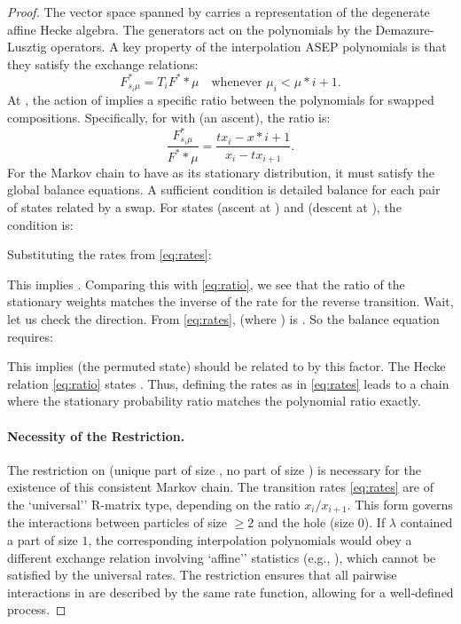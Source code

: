 \documentclass[12pt]{article}
\begin{document}
\begin{proof}
The vector space spanned by  carries a representation of the degenerate affine Hecke algebra. The generators  act on the polynomials  by the Demazure-Lusztig operators. A key property of the interpolation ASEP polynomials is that they satisfy the exchange relations:
\begin{equation} \label{eq:hecke}
F^*_{s_i \mu} = T_i F^**\mu \quad \text{whenever } \mu_i < \mu*{i+1}.
\end{equation}
At , the action of  implies a specific ratio between the polynomials for swapped compositions. Specifically, for  with  (an ascent), the ratio is:
\begin{equation} \label{eq:ratio}
\frac{F^*_{s_i \mu}}{F^**\mu} = \frac{t x_i - x*{i+1}}{x_i - t x_{i+1}}.
\end{equation}
For the Markov chain to have  as its stationary distribution, it must satisfy the global balance equations. A sufficient condition is detailed balance for each pair of states related by a swap. For states  (ascent at ) and  (descent at ), the condition is:

Substituting the rates from \eqref{eq:rates}:

This implies . Comparing this with \eqref{eq:ratio}, we see that the ratio of the stationary weights matches the inverse of the rate for the reverse transition.
Wait, let us check the direction.
From \eqref{eq:rates},  (where ) is .
So the balance equation requires:

This implies  (the permuted state) should be related to  by this factor.
The Hecke relation \eqref{eq:ratio} states .
Thus, defining the rates as in \eqref{eq:rates} leads to a chain where the stationary probability ratio matches the polynomial ratio exactly.

\paragraph{Necessity of the Restriction.}
The restriction on  (unique part of size , no part of size ) is necessary for the existence of this consistent Markov chain. The transition rates \eqref{eq:rates} are of the `universal'' R-matrix type, depending on the ratio $x_i/x_{i+1}$. This form governs the interactions between particles of size $\ge 2$ and the hole (size $0$). If $\lambda$ contained a part of size $1$, the corresponding interpolation polynomials would obey a different exchange relation involving `affine'' statistics (e.g., ), which cannot be satisfied by the universal rates. The restriction ensures that all pairwise interactions in  are described by the same rate function, allowing for a well-defined process.
\end{proof}
\end{document}
